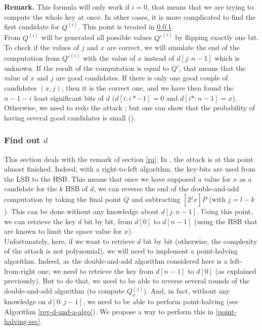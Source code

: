 \documentclass[journal]{IEEEtran}
\begin{document}
\label{rq}
{\bf Remark.} This formula will only work if $i = 0$, that means that we are trying to compute the whole key at once. In other cases, it is more complicated
to find the first candidate for $Q^{(i)}$. This point is treated in \ref{difficulties}.\\


From $Q^{(i)}$ will be generated all possible values $Q'^{(i)}$ by flipping exactly one bit. To check if the values of $j$ and $x$ are correct, 
we will simulate the end of the computation from $Q'^{(i)}$ with the value of $x$ instead of $d[j:n-1]$ which is unknown. If the result of the computation
is equal to $Q'$, that means that the value of $x$ and $j$ are good candidates.
If there is only one good couple of candidates $(x, j)$, then it is the correct one, and we have then found the $n - 1 - i$ least significant bits of $d$ ($d[i:i*-1] = 0$ and $d[i*:n-1] = x$).
Otherwise, we need to redo the attack ; but one can show that the probability of having several good candidates is small 
(\cite{biehl2000differential}).\\

\subsubsection{Find out $d$}
\label{difficulties}
This section deals with the remark of section \ref{rq}.
In \cite{biehl2000differential}, the attack is at this point almost finished. Indeed, with a right-to-left algorithm, the key-bits are used from the LSB to the HSB. This means that 
once we have supposed a value for $x$ as a candidate for the $k$ HSB of $d$, we can reverse the end of the double-and-add computation by taking the final point 
$Q$ and subtracting $[2^{j}x]P$ (with $j = l - k$). This can be done without any knowledge about $d[j:n-1]$. Using this point, we can retrieve the key $d$ bit by bit, from $d[0]$ to 
$d[n-1]$ (using the HSB that are known to limit the space value for $x$).\\

Unfortunately, here, if we want to retrieve $d$ bit by bit (otherwise, the complexity of the attack is not polynomial), we will need to implement a point-halving algorithm. 
Indeed, as the double-and-add algorithm considered here is a left-from-right one, we need to retrieve the key from $d[n-1]$ to $d[0]$ (as explained previously). But to do that, we need
to be able to reverse several rounds of the double-and-add algorithm (to compute $Q_x^{(j)}$). And, in fact, without any knowledge on $d[0:j-1]$, we need to be able to perform point-halving
(see Algorithm \ref{rev-d-and-a-algo}). We propose a way to perform this in \ref{point-halving-sec}.
\end{document}
